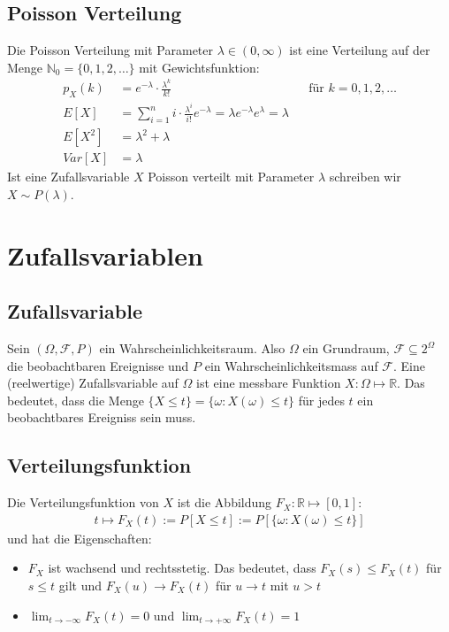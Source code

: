 \documentclass[8pt]{extarticle}
\newcommand{\N}{\mathbb{N}}
\newcommand{\R}{\mathbb{R}}
\newcommand{\F}{\mathcal{F}}
\newcommand{\ra}{\rightarrow}
\newcommand{\Sn}{\sum_{i = 1}^n}
\begin{document}
\begin{multicols*}{3}
  \subsection*{Poisson Verteilung}
  Die Poisson Verteilung mit Parameter $\lambda \in (0, \infty)$
  ist eine Verteilung auf der Menge $\N_0 = \{0, 1, 2, \dots\}$
  mit Gewichtsfunktion:
  \begin{align*}
    p_X(k) & = e^{-\lambda} \cdot \frac{\lambda^k}{k!}
           &                                                                                            & \text{für } k = 0, 1, 2, \dots \\
    E[X]   & = \Sn i \cdot \frac{\lambda^i}{i!} e^{-\lambda} = \lambda e^{-\lambda} e^\lambda = \lambda                                  \\
    E[X^2] & = \lambda^2 + \lambda                                                                                                       \\
    Var[X] & = \lambda
  \end{align*}
  Ist eine Zufallsvariable $X$ Poisson verteilt mit Parameter $\lambda$
  schreiben wir $X \sim P(\lambda)$.
  \hypertarget{sec:2}{\section{Zufallsvariablen}}
  \subsection*{Zufallsvariable}
  Sein $(\Omega, \F, P)$ ein Wahrscheinlichkeitsraum. Also
  $\Omega$ ein Grundraum, $\F \subseteq 2^\Omega$ die beobachtbaren
  Ereignisse und $P$ ein Wahrscheinlichkeitsmass auf $\F$. Eine
  (reelwertige) Zufallsvariable auf $\Omega$ ist eine messbare Funktion
  $X : \Omega \mapsto \R$. Das bedeutet, dass die Menge
  $\{X \leq t\} = \{\omega : X(\omega) \leq t\}$ für jedes $t$ ein
  beobachtbares Ereigniss sein muss.
  \subsection*{Verteilungsfunktion}
  Die Verteilungsfunktion von $X$ ist die Abbildung $F_X : \R \mapsto [0, 1]$:
  \begin{align*}
    t \mapsto F_X(t) := P[X \leq t] := P[\{\omega : X(\omega) \leq t\}]
  \end{align*}
  und hat die Eigenschaften:
  \begin{itemize}
    \item $F_X$ ist wachsend und rechtsstetig. Das bedeutet,
          dass $F_X(s) \leq F_X(t)$ für $s \leq t$ gilt und $F_X(u) \ra F_X(t)$
          für $u \ra t$ mit $u > t$
    \item $\lim_{t \ra - \infty} F_X(t) = 0$ und $\lim_{t \ra + \infty} F_X(t) = 1$
  \end{itemize}

\end{multicols*}
\end{document}
